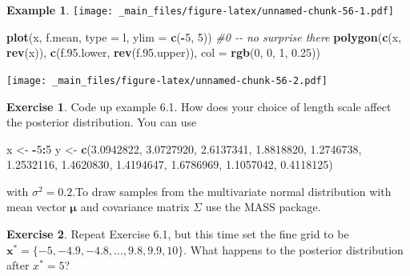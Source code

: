 \documentclass[
]{book}
\newenvironment{Shaded}{\begin{snugshade}}{\end{snugshade}}
\newcommand{\AttributeTok}[1]{\textcolor[rgb]{0.13,0.29,0.53}{#1}}
\newcommand{\CommentTok}[1]{\textcolor[rgb]{0.56,0.35,0.01}{\textit{#1}}}
\newcommand{\DecValTok}[1]{\textcolor[rgb]{0.00,0.00,0.81}{#1}}
\newcommand{\FloatTok}[1]{\textcolor[rgb]{0.00,0.00,0.81}{#1}}
\newcommand{\FunctionTok}[1]{\textcolor[rgb]{0.13,0.29,0.53}{\textbf{#1}}}
\newcommand{\NormalTok}[1]{#1}
\newcommand{\OtherTok}[1]{\textcolor[rgb]{0.56,0.35,0.01}{#1}}
\newcommand{\SpecialCharTok}[1]{\textcolor[rgb]{0.81,0.36,0.00}{\textbf{#1}}}
\newcommand{\StringTok}[1]{\textcolor[rgb]{0.31,0.60,0.02}{#1}}
\theoremstyle{definition}
\theoremstyle{definition}
\newtheorem{example}{Example}[chapter]
\theoremstyle{definition}
\newtheorem{exercise}{Exercise}[chapter]
\theoremstyle{definition}
\theoremstyle{remark}
\begin{document}
\begin{example}
\texttt{[image: \_main\_files/figure-latex/unnamed-chunk-56-1.pdf]}

\begin{Shaded}
\begin{Highlighting}[]
\FunctionTok{plot}\NormalTok{(x, f.mean, }\AttributeTok{type =} \StringTok{\textquotesingle{}l\textquotesingle{}}\NormalTok{, }\AttributeTok{ylim =} \FunctionTok{c}\NormalTok{(}\SpecialCharTok{{-}}\DecValTok{5}\NormalTok{, }\DecValTok{5}\NormalTok{)) }\CommentTok{\#0 {-}{-} no surprise there}
\FunctionTok{polygon}\NormalTok{(}\FunctionTok{c}\NormalTok{(x, }\FunctionTok{rev}\NormalTok{(x)), }\FunctionTok{c}\NormalTok{(f.}\FloatTok{95.}\NormalTok{lower, }\FunctionTok{rev}\NormalTok{(f.}\FloatTok{95.}\NormalTok{upper)), }\AttributeTok{col =} \FunctionTok{rgb}\NormalTok{(}\DecValTok{0}\NormalTok{, }\DecValTok{0}\NormalTok{, }\DecValTok{1}\NormalTok{, }\FloatTok{0.25}\NormalTok{))}
\end{Highlighting}
\end{Shaded}

\texttt{[image: \_main\_files/figure-latex/unnamed-chunk-56-2.pdf]}
\end{example}

\begin{exercise}
Code up example 6.1. How does your choice of length scale affect the posterior distribution. You can use

\begin{Shaded}
\begin{Highlighting}[]
\NormalTok{x }\OtherTok{\textless{}{-}} \SpecialCharTok{{-}}\DecValTok{5}\SpecialCharTok{:}\DecValTok{5}
\NormalTok{y }\OtherTok{\textless{}{-}}  \FunctionTok{c}\NormalTok{(}\FloatTok{3.0942822}\NormalTok{, }\FloatTok{3.0727920}\NormalTok{, }\FloatTok{2.6137341}\NormalTok{, }\FloatTok{1.8818820}\NormalTok{, }\FloatTok{1.2746738}\NormalTok{, }\FloatTok{1.2532116}\NormalTok{, }\FloatTok{1.4620830}\NormalTok{, }\FloatTok{1.4194647}\NormalTok{, }\FloatTok{1.6786969}\NormalTok{, }\FloatTok{1.1057042}\NormalTok{, }\FloatTok{0.4118125}\NormalTok{)}
\end{Highlighting}
\end{Shaded}

with \(\sigma^2 = 0.2\).To draw samples from the multivariate normal distribution with mean vector \(\boldsymbol{\mu}\) and covariance matrix \(\Sigma\) use the MASS package.
\end{exercise}

\begin{exercise}
Repeat Exercise 6.1, but this time set the fine grid to be \(\boldsymbol{x}^* = \{-5, -4.9, -4.8, \ldots, 9.8, 9.9, 10\}\). What happens to the posterior distribution after \(x^* = 5\)?
\end{exercise}
\end{document}

